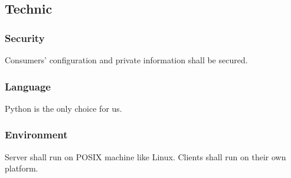   \subsection{Technic}
    \subsubsection{Security}
      Consumers' configuration and private information shall be secured.
    \subsubsection{Language}
      Python is the only choice for us.
    \subsubsection{Environment}
      Server shall run on POSIX machine like Linux.
      Clients shall run on their own platform.

